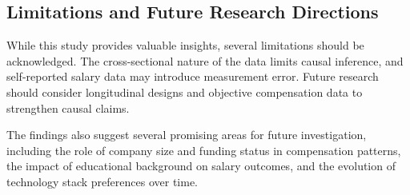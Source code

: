 \subsection*{Limitations and Future Research Directions}

While this study provides valuable insights, several limitations should be acknowledged. The cross-sectional nature of the data limits causal inference, and self-reported salary data may introduce measurement error. Future research should consider longitudinal designs and objective compensation data to strengthen causal claims.

The findings also suggest several promising areas for future investigation, including the role of company size and funding status in compensation patterns, the impact of educational background on salary outcomes, and the evolution of technology stack preferences over time.
